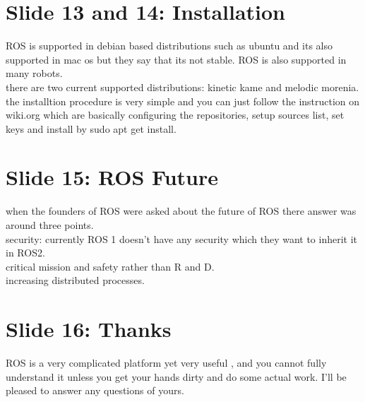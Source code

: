 \documentclass[
12pt,draftcls,onecolumn%
]{IEEEtran}
\begin{document}
\section{Slide 13 and 14: Installation }
ROS is supported in debian based distributions such as ubuntu and its also supported in mac os but they say that its not stable. ROS is also supported in many robots. 
\\there are two current supported distributions: kinetic kame and melodic morenia. 
\\the installtion procedure is very simple and you can just follow the instruction on wiki.org which are basically configuring the repositories, setup sources list, set keys and install by sudo apt get install. 
\section{Slide 15: ROS Future}
when the founders of ROS were asked about the future of ROS there answer was around three points. \\security: currently ROS 1 doesn't have any security which they want to inherit it in ROS2. \\critical mission and safety rather than R and D. \\increasing distributed processes. 
\section{ Slide 16: Thanks}
ROS is a very complicated platform yet very useful , and you cannot fully understand it unless you get your hands dirty and do some actual work. I'll be pleased to answer any questions of yours. 
\end{document}
